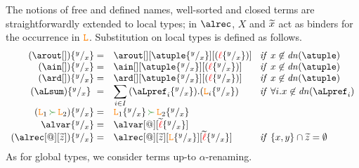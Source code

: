The notions of free and defined names, well-sorted and closed terms
are straightforwardly extended to local types; in $\alrec$, 
 $X$ and $\widetilde{x}$ act as binders for the occurrence in $\texttt{\textcolor{orange}L}$.
%
%
%
Substitution on local types is defined as follows. 
\[
\begin{array}{rl@{\hspace{.3cm}}l}
  (\arout[]) \sust x y  = &  \arout[][\atuple\sust x y][(\alocvar\sust x y)] &  {\it if}\  x\not\in\dn\atuple
  \\
  (\ain[]) \sust x y  = &  \ain[][\atuple\sust x y][(\alocvar\sust x y)] &  {\it if}\  x\not\in\dn\atuple
  \\
  (\ard[]) \sust x y  = &  \ard[][\atuple\sust x y][(\alocvar\sust x y)] &  {\it if}\  x\not\in\dn\atuple
  \\
   (\aLsum)\sust x y  = & \displaystyle{\sum_{i\in I} {(\aLpref_{i}\sust x y).(\aL_{i}\sust x y)}}
   &  {\it if}\  \forall i. x\not\in\dn{\aLpref_i}
  \\
  (\aL_1\seqop\aL_2)\sust x y  = &  \aL_1\sust x y\seqop  \aL_2\sust x y 
  \\
  \alvar\sust x y  = & \alvar[@][\seq\alocvar\sust x y]  
  \\
  (\alrec[@][\seq z])\sust x y  = & \alrec[@][\seq z][\aL\sust x y][\seq\alocvar\sust x y] &  {\it if}\  \{x,y\}\cap\seq z = \emptyset
\end{array}
\]
%
%
%
%
%
As for global types, we consider terms up-to $\alpha$-renaming.
 
